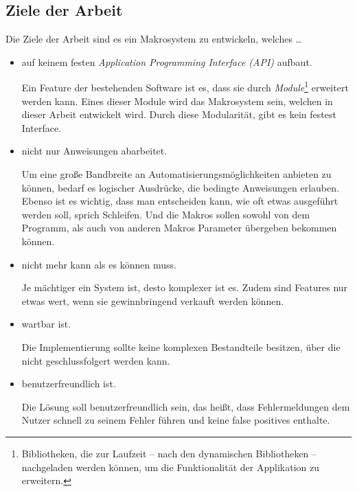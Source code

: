   \subsection{Ziele der Arbeit}
  \label{ssec:Ziele der Arbeit}
    Die Ziele der Arbeit sind es ein Makrosystem zu entwickeln, welches \ldots
    \begin{itemize}
      \item auf keinem festen \emph{Application Programming Interface (API)} aufbaut.

        Ein Feature der bestehenden Software ist es, dass sie durch \emph{Module}\footnote{
          Bibliotheken, die zur Laufzeit -- nach den dynamischen Bibliotheken --  nachgeladen werden können, um die Funktionalität der Applikation zu erweitern.
        } erweitert werden kann. Eines dieser Module wird das Makrosystem sein, welchen in dieser Arbeit entwickelt wird. Durch diese Modularität, gibt es kein festest Interface.

      \item nicht nur Anweisungen abarbeitet.

        Um eine große Bandbreite an Automatisierungsmöglichkeiten anbieten zu können, bedarf es logischer Ausdrücke, die bedingte Anweisungen erlauben. Ebenso ist es wichtig, dass man entscheiden kann, wie oft etwas ausgeführt werden soll, sprich Schleifen. Und die Makros sollen sowohl von dem Programm, als auch von anderen Makros Parameter übergeben bekommen können.

      \item nicht mehr kann als es können muss.

        Je mächtiger ein System ist, desto komplexer ist es. Zudem sind Features nur etwas wert, wenn sie gewinnbringend verkauft werden können.

      \item wartbar ist.

        Die Implementierung sollte keine komplexen Bestandteile besitzen, über die nicht geschlussfolgert werden kann.

      \item benutzerfreundlich ist.

        Die Lösung soll benutzerfreundlich sein, das heißt, dass Fehlermeldungen dem Nutzer schnell zu seinem Fehler führen und keine false positives enthalte.
    \end{itemize}


